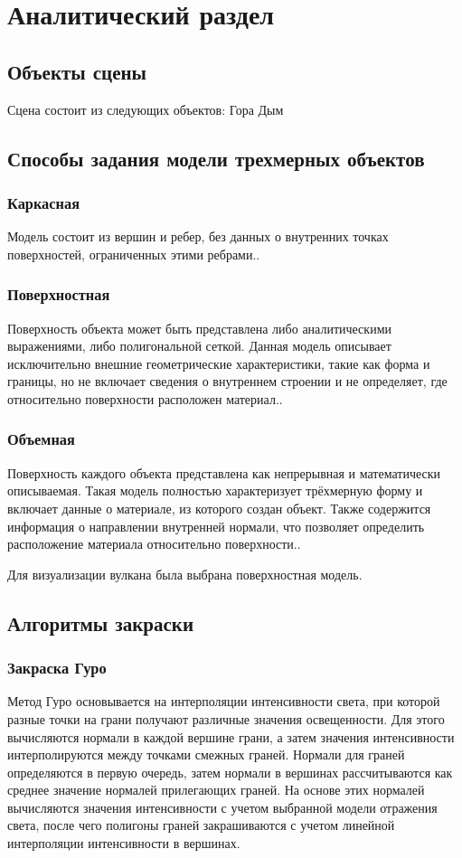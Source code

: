\chapter{Аналитический раздел}
\section{Объекты сцены}
Сцена состоит из следующих объектов:
Гора
Дым
\section{Способы задания модели трехмерных объектов}

\subsection{Каркасная}
Модель состоит из вершин и ребер, без данных о внутренних точках поверхностей, ограниченных этими ребрами.\cite{lit2}.

\subsection{Поверхностная}
Поверхность объекта может быть представлена либо аналитическими выражениями, либо полигональной сеткой. Данная модель описывает исключительно внешние геометрические характеристики, такие как форма и границы, но не включает сведения о внутреннем строении и не определяет, где относительно поверхности расположен материал.\cite{lit2}.

\subsection{Объемная}
Поверхность каждого объекта представлена как непрерывная и математически описываемая. Такая модель полностью характеризует трёхмерную форму и включает данные о материале, из которого создан объект. Также содержится информация о направлении внутренней нормали, что позволяет определить расположение материала относительно поверхности.\cite{lit2}.


Для визуализации вулкана была выбрана поверхностная модель.

\section{Алгоритмы закраски}

\subsection{Закраска Гуро}
Метод Гуро основывается на интерполяции интенсивности света, при которой разные точки на грани получают различные значения освещенности. Для этого вычисляются нормали в каждой вершине грани, а затем значения интенсивности интерполируются между точками смежных граней. Нормали для граней определяются в первую очередь, затем нормали в вершинах рассчитываются как среднее значение нормалей прилегающих граней. На основе этих нормалей вычисляются значения интенсивности с учетом выбранной модели отражения света, после чего полигоны граней закрашиваются с учетом линейной интерполяции интенсивности в вершинах.

